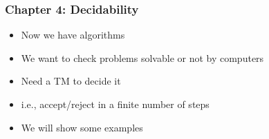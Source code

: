 




\begin{frame}[allowframebreaks] \frametitle{Chapter 4: Decidability}
  \begin{itemize}
\item Now we have algorithms
\item We want to check problems solvable or not by computers

\item Need a TM to decide it

\item [] i.e., accept/reject in a finite number of steps

\item We will show some examples
  
\end{itemize}\end{frame}

